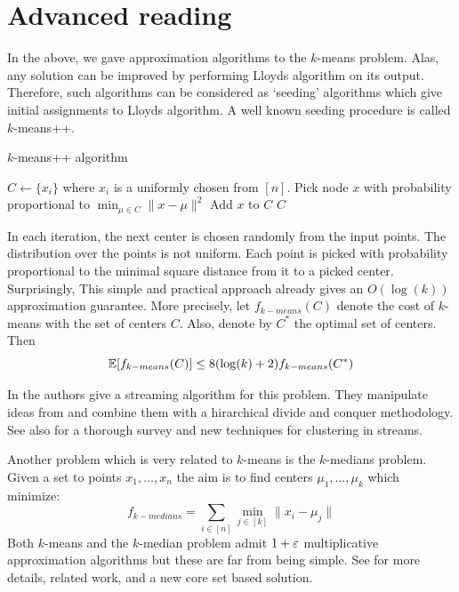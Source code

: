 \documentclass{article}
\begin{document}
\section{Advanced reading}

In the above, we gave approximation algorithms to the $k$-means problem.
Alas, any solution can be improved by performing Lloyds algorithm on its output.
Therefore, such algorithms can be considered as `seeding' algorithms 
which give initial assignments to Lloyds algorithm.
A well known seeding procedure \cite{ArthurV07} is called $k$-means++.
\begin{algorithm}
\caption{$k$-means++ algorithm  \cite{ArthurV07}}
\begin{algorithmic}
\STATE $C \leftarrow \{x_i\}$ where $x_i$ is a uniformly chosen from $[n]$.
	\STATE Pick node $x$ with probability proportional to $\min_{\mu \in C} \|x - \mu\|^2$
	\STATE Add $x$ to $C$
\ENDFOR
{} $C$
\end{algorithmic}
\end{algorithm}
In each iteration, the next center is chosen randomly from the input points.
The distribution over the points is not uniform. 
Each point is picked with probability proportional to the minimal square distance from it to a picked center.
Surprisingly, This simple and practical approach already gives an $O(\log(k))$ approximation guarantee.
More precisely, let $f_{k-means}(C)$ denote the cost of $k$-means with the set of centers $C$.
Also, denote by $C^*$ the optimal set of centers. Then 
\[
{\mathbb E}[f_{k-means}(C)] \le 8 (\log(k)+2)f_{k-means}(C^*)
\]

In \cite{AilonJM09} the authors give a streaming algorithm for this problem.
They manipulate ideas from \cite{ArthurV07} and combine them with a hirarchical 
divide and conquer methodology. See also \cite{GuhaMMMO03} for a thorough survey and
new techniques for clustering in streams.

Another problem which is very related to $k$-means is the $k$-medians problem.
Given a set to points $x_1,\ldots,x_n$ the aim is to find centers $\mu_1,\ldots,\mu_k$ which minimize:
\[
f_{k-medians} = \sum_{i \in [n]} \min_{j \in [k]} \|x_i - \mu_j \|
\]
Both $k$-means and the $k$-median problem admit $1+\varepsilon$ multiplicative approximation algorithms but these
are far from being simple. See \cite{hk-sckmk-05} for more details, related work, and a new core set based solution. 




\end{document}
